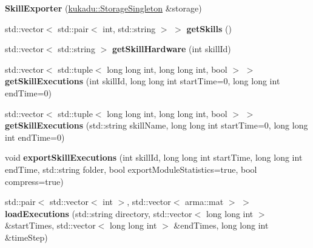 \begin{DoxyCompactItemize}
\item 
{\bfseries Skill\+Exporter} (\hyperlink{classkukadu_1_1StorageSingleton}{kukadu\+::\+Storage\+Singleton} \&storage)\hypertarget{classkukadu_1_1SkillExporter_a33f66b1cfaf110b5edc4baf2bb39344f}{}\label{classkukadu_1_1SkillExporter_a33f66b1cfaf110b5edc4baf2bb39344f}

\item 
std\+::vector$<$ std\+::pair$<$ int, std\+::string $>$ $>$ {\bfseries get\+Skills} ()\hypertarget{classkukadu_1_1SkillExporter_a1b8a9e26dc7e79ee7f1994c3942a316e}{}\label{classkukadu_1_1SkillExporter_a1b8a9e26dc7e79ee7f1994c3942a316e}

\item 
std\+::vector$<$ std\+::string $>$ {\bfseries get\+Skill\+Hardware} (int skill\+Id)\hypertarget{classkukadu_1_1SkillExporter_a71818361af73be96cc97cdeed8eb235b}{}\label{classkukadu_1_1SkillExporter_a71818361af73be96cc97cdeed8eb235b}

\item 
std\+::vector$<$ std\+::tuple$<$ long long int, long long int, bool $>$ $>$ {\bfseries get\+Skill\+Executions} (int skill\+Id, long long int start\+Time=0, long long int end\+Time=0)\hypertarget{classkukadu_1_1SkillExporter_a1a6a44d9f015246ffc471aa93cf087a1}{}\label{classkukadu_1_1SkillExporter_a1a6a44d9f015246ffc471aa93cf087a1}

\item 
std\+::vector$<$ std\+::tuple$<$ long long int, long long int, bool $>$ $>$ {\bfseries get\+Skill\+Executions} (std\+::string skill\+Name, long long int start\+Time=0, long long int end\+Time=0)\hypertarget{classkukadu_1_1SkillExporter_a772cd59c072cf66b604c8b191d6d994d}{}\label{classkukadu_1_1SkillExporter_a772cd59c072cf66b604c8b191d6d994d}

\item 
void {\bfseries export\+Skill\+Executions} (int skill\+Id, long long int start\+Time, long long int end\+Time, std\+::string folder, bool export\+Module\+Statistics=true, bool compress=true)\hypertarget{classkukadu_1_1SkillExporter_ab77d4a264fb1068b5d5a1428695269bd}{}\label{classkukadu_1_1SkillExporter_ab77d4a264fb1068b5d5a1428695269bd}

\item 
std\+::pair$<$ std\+::vector$<$ int $>$, std\+::vector$<$ arma\+::mat $>$ $>$ {\bfseries load\+Executions} (std\+::string directory, std\+::vector$<$ long long int $>$ \&start\+Times, std\+::vector$<$ long long int $>$ \&end\+Times, long long int \&time\+Step)\hypertarget{classkukadu_1_1SkillExporter_a6b568f6555511d616aabe230df0d13f8}{}\label{classkukadu_1_1SkillExporter_a6b568f6555511d616aabe230df0d13f8}


\end{DoxyCompactItemize}
